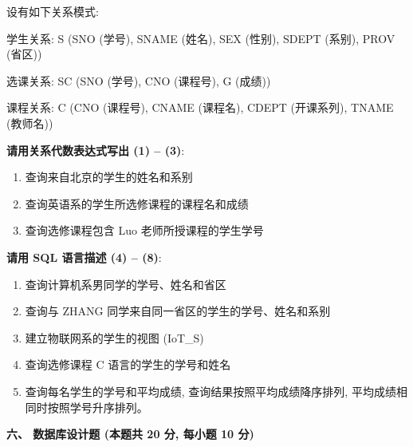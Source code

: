 \documentclass{ctexart} %
\begin{document}
设有如下关系模式:

学生关系: S (SNO (学号), SNAME (姓名), SEX (性别), SDEPT (系别), PROV (省区))

选课关系: SC (SNO (学号), CNO (课程号), G (成绩))

课程关系: C (CNO (课程号), CNAME (课程名), CDEPT (开课系列), TNAME (教师名))

\textbf{请用关系代数表达式写出 (1) -- (3)}: %
\begin{enumerate}[label=\arabic*.]
    \item 查询来自北京的学生的姓名和系别
    \item 查询英语系的学生所选修课程的课程名和成绩
    \item 查询选修课程包含 Luo 老师所授课程的学生学号
\end{enumerate}

\textbf{请用 SQL 语言描述 (4) -- (8)}: %
\begin{enumerate}[label=\arabic*., resume] %
    \item 查询计算机系男同学的学号、姓名和省区
    \item 查询与 ZHANG 同学来自同一省区的学生的学号、姓名和系别
    \item 建立物联网系的学生的视图 (IoT\_S)
    \item 查询选修课程 C 语言的学生的学号和姓名
    \item 查询每名学生的学号和平均成绩, 查询结果按照平均成绩降序排列, 平均成绩相同时按照学号升序排列。
\end{enumerate}

\vspace{2em}

\raggedright
\textbf{\large 六、 数据库设计题 (本题共 20 分, 每小题 10 分)} %
\vspace{1em}
\end{document}
